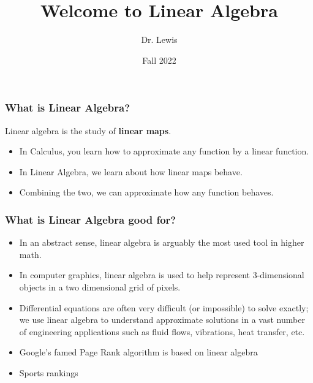 \documentclass[aspectratio=1610]{beamer}
\title{Welcome to Linear Algebra}
\author{Dr. Lewis}
\date{Fall 2022}
\begin{document}
\begin{frame}
\titlepage
\end{frame}

%  
 



\begin{frame} \frametitle{What is Linear Algebra? }
Linear algebra is the study of {\bf linear maps}.
\begin{itemize}
\item In Calculus, you learn how to approximate any function by a linear function.
\item In Linear Algebra, we learn about how linear maps behave.
\item Combining the two, we can approximate how any function behaves.
\end{itemize}
\end{frame}

\begin{frame} \frametitle{What is Linear Algebra good for?}
\begin{itemize}
\item In an abstract sense, linear algebra is arguably the most used tool in higher math.
\item In computer graphics, linear algebra is used to help represent 3-dimensional objects in a two dimensional grid of pixels.
\item Differential equations are often very difficult (or impossible) to solve exactly; we use linear algebra to understand approximate solutions in a vast number of engineering applications such as fluid flows, vibrations, heat transfer, etc.
\item Google's famed Page Rank algorithm is based on linear algebra
\item Sports rankings 
\end{itemize}
\end{frame}
\end{document}
